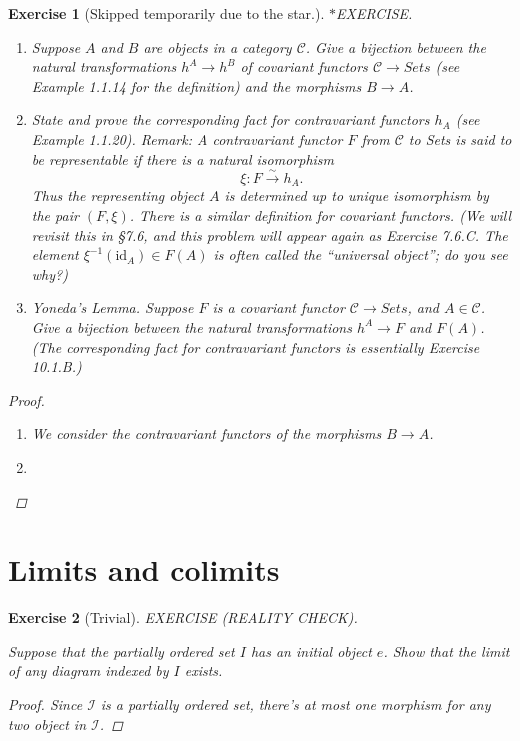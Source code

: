 \documentclass{article}
\theoremstyle{breakstyle}
\newtheorem{exercise}{Exercise}[section]
\begin{document}
\begin{exercise}[Skipped temporarily due to the star.]
$\ast$EXERCISE.

\begin{enumerate}[label=({\alph*})]
\item Suppose $A$ and $B$ are objects in a category $\mathcal{C}$. Give a
    bijection between the natural transformations $h^A \to h^B$ of covariant
    functors $\mathcal{C} \to Sets$ (see Example 1.1.14 for the definition)
    and the morphisms $B \to A$.
\item State and prove the corresponding fact for contravariant functors
    $h_{A}$ (see Example 1.1.20). Remark: A contravariant functor $F$ from
    $\mathcal{C}$ to Sets is said to be representable if there is a natural
    isomorphism
    $$
    \xi \colon F \xrightarrow{\sim} h_{A}.
    $$
    Thus the representing object $A$ is determined up to unique isomorphism
    by the pair $(F, \xi)$. There is a similar definition for covariant
    functors. (We will revisit this in \S\emph{7.6}, and this problem will
    appear again as Exercise 7.6.C. The element $\xi^{-1}(\mathrm{id}_A) \in
    F(A)$ is often called the ``universal object''; do you see why?)
\item Yoneda's Lemma. Suppose $F$ is a covariant functor $\mathcal{C} \to
    Sets$, and $A \in \mathcal{C}$. Give a bijection between the natural
    transformations $h^A \to F$ and $F(A)$. (The corresponding fact for
    contravariant functors is essentially Exercise 10.1.B.)
\end{enumerate}

\begin{proof}
	\begin{enumerate}
        \item We consider the contravariant functors of the morphisms
            $B\longrightarrow A$.
		\item 
	\end{enumerate}
\end{proof}

\end{exercise}

\section{Limits and colimits}
\begin{exercise}[Trivial]
EXERCISE (REALITY CHECK).

Suppose that the partially ordered set $I$ has an initial object $e$. Show
that the limit of any diagram indexed by $I$ exists.

\begin{proof}
    Since $\mathscr{I}$ is a partially ordered set, there's at most one morphism
    for any two object in $\mathscr{I}$. 
\end{proof}

\end{exercise}
\end{document}
